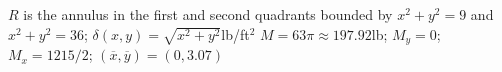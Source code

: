 {$R$ is the annulus in the first and second quadrants  bounded by $x^2+y^2=9$ and $x^2+y^2=36$; $\delta(x,y) = \sqrt{x^2+y^2}$lb/ft$^2$
}
{$M = 63\pi\approx 197.92$lb; $M_y= 0$; $M_x = 1215/2$; $(\overline{x},\overline{y}) = (0,3.07)$
}
